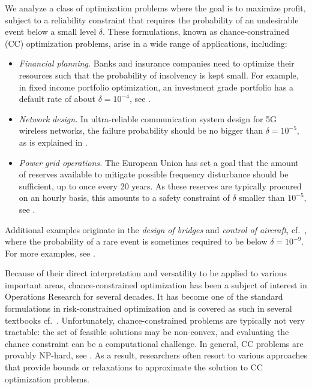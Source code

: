 \documentclass[a4paper, a4wide, 10pt, reqno]{amsart}
\theoremstyle{plain}
\begin{document}
We analyze a class of optimization problems
where the goal is to maximize profit, subject to a reliability constraint that requires the probability of an undesirable event below a small level $\delta$. These formulations, known as chance-constrained (CC) optimization problems, arise in a wide range of applications, including:
\begin{itemize}
    \item[--] {\em Financial planning.} Banks and insurance companies need to optimize their resources such that the probability of insolvency is kept small. 
     For example, in fixed income portfolio optimization, an investment grade portfolio has a default rate of about $\delta=10^{-4}$, see \cite{frank2008municipal}. 
    \item[--] {\em Network design.} In ultra-reliable communication system design for 5G wireless networks, the failure probability should be no bigger than $\delta=10^{-5}$, as is explained in \cite{alsenwi2019chance}. 
     \item[--] {\em Power grid operations.} The European Union has set a goal that the amount of reserves available to mitigate possible frequency disturbance should be sufficient, up to once every 20 years. As these reserves are typically procured on an hourly basis, this amounts to a safety constraint of $\delta$ smaller than $10^{-5}$,
     see \cite{entso-e}.  
\end{itemize}
Additional examples originate in the {\em design of bridges} and {\em control of aircraft}, cf.\ \cite{flightcontrol}, where the probability of a rare event is sometimes required to be below $\delta = 10^{-9}$. For more examples, see \cite{Subramanyam2020, tong2020optimization}. 

Because of their direct interpretation and versatility to be applied to various important areas, 
chance-constrained optimization has been a subject of interest in Operations Research for several decades. It has become one of the standard formulations in risk-constrained optimization and is covered as such in several textbooks cf.\ \cite{prekopa1970probabilistic, prekopa2003probabilistic,  Romeijnders20, Shapiro2021}. 
Unfortunately, chance-constrained problems are typically not very tractable: the set of feasible solutions may be non-convex, and evaluating the chance constraint can be a computational challenge. In general, CC problems are provably NP-hard, see \cite{luedtke2010integer}. As a result, researchers often resort to various approaches that provide bounds or relaxations to approximate the solution to CC optimization problems. 
\end{document}
